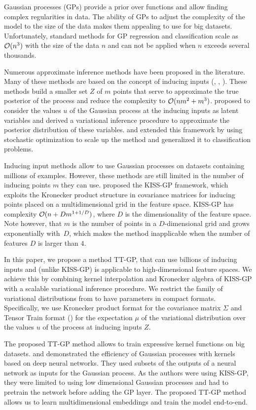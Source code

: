 Gaussian processes (GPs) provide a prior over functions and allow finding complex
regularities in data. The ability of GPs to adjust the complexity of the model
to the size of the data makes them appealing to use for big datasets.
Unfortunately, standard methods for GP regression and classification scale as
$\mathcal{O}(n^3)$ with the size of the data $n$ and can not be applied when $n$
exceeds several thousands.

Numerous approximate inference methods have been proposed in the literature. Many
of these methods are based on the concept of inducing inputs (\citet{candela2005},
\citet{snelson2006}, \citet{williams2000}). These methods build a smaller set
$Z$ of $m$ points that serve to approximate the true posterior of the process
and reduce the complexity to $\mathcal{O}(nm^2 + m^3)$. \citet{titsias2009} proposed
to consider the values $u$ of the Gaussian process at the inducing inputs
as latent variables and derived a variational inference procedure to approximate
the posterior distribution of these variables. \citet{hensman2013} and
\citet{hensman2015} extended this framework by using stochastic optimization to
scale up the method and generalized it to classification problems.

Inducing input methods allow to use Gaussian processes on datasets containing
millions of examples. However, these methods are still limited in the number
of inducing points $m$ they can use. \citet{wilson2015} proposed the KISS-GP
framework, which exploits the Kronecker product structure in covariance matrices
for inducing points placed on a multidimensional grid in the feature space.
KISS-GP has complexity $\mathcal{O}(n + D m^{1 + 1/D})$, where $D$ is the dimensionality
of the feature space. Note however, that $m$ is the number of points in a
$D$-dimensional grid and grows exponentially with~$D$, which makes the method
inapplicable when the number of features $D$ is larger than $4$.

In this paper, we propose a method TT-GP, that can use billions of inducing
inputs and (unlike KISS-GP) is applicable to high-dimensional feature spaces.
We achieve this by combining kernel interpolation and Kronecker algebra of KISS-GP with
a scalable variational inference procedure. We restrict the family of
variational distributions from \citet{hensman2013} to have parameters in
compact formats. Specifically, we use Kronecker product format for the
covariance matrix $\Sigma$ and Tensor Train format (\citet{oseledets2011}) for the
expectation $\mu$ of the variational distribution over the values $u$ of the
process at inducing inputs $Z$.

The proposed TT-GP method allows to train expressive kernel functions
on big datasets. \citet{wilson2016deep} and \citet{wilson2016stochastic}
demonstrated the efficiency of Gaussian processes with kernels based on deep
neural networks. They used subsets of the outputs of a neural network as
inputs for the Gaussian process. As the authors were using KISS-GP, they
were limited to using low dimensional Gaussian processes and had to
pretrain the network before adding the GP layer. The proposed TT-GP method
allows us to learn multidimensional embeddings and train the model end-to-end.
